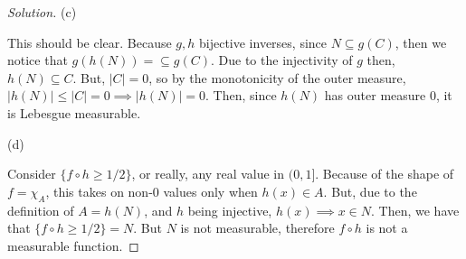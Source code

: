 \documentclass[10pt]{article}
\begin{document}
\begin{proof}[Solution]
(c)

This should be clear. Because $g,h$ bijective inverses, since $N \subseteq g(C)$, then we notice that $g(h(N)) = \subseteq g(C)$. Due to the injectivity of $g$ then, $h(N) \subseteq C$. But, $|C| = 0$, so by the monotonicity of the outer measure, $|h(N)| \leq |C| = 0 \implies |h(N)| = 0$. Then, since $h(N)$ has outer measure 0, it is Lebesgue measurable.

(d)

Consider $\{ f \circ h \geq 1/2 \}$, or really, any real value in $(0,1]$. Because of the shape of $f = \chi_{A}$, this takes on non-0 values only when $h(x) \in A$. But, due to the definition of $A = h(N)$, and $h$ being injective, $h(x) \implies x \in N$. Then, we have that $\{ f \circ h \geq 1/2 \} = N$. But $N$ is not measurable, therefore $f \circ h$ is not a measurable function.

\end{proof}

 
\end{document}
